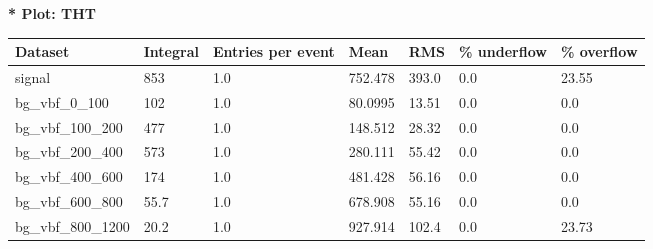 \documentclass[a4paper, 10pt]{article}
\begin{document}
\textbf{* Plot: THT}\\
   \begin{table}[H]
  \begin{center}
    \begin{tabular}{|m{23.0mm}|m{23.0mm}|m{18.0mm}|m{19.0mm}|m{19.0mm}|m{19.0mm}|m{19.0mm}|}
      \hline
      {\cellcolor{yellow}         Dataset}& {\cellcolor{yellow}         Integral}& {\cellcolor{yellow}         Entries per event}& {\cellcolor{yellow}         Mean}& {\cellcolor{yellow}         RMS}& {\cellcolor{yellow}         \% underflow}& {\cellcolor{yellow}         \% overflow}\\
      \hline
      {\cellcolor{white}         signal}& {\cellcolor{white}         853}& {\cellcolor{white}         1.0}& {\cellcolor{white}         752.478}& {\cellcolor{white}         393.0}& {\cellcolor{red}         0.0}& {\cellcolor{red}         23.55}\\
      \hline
      {\cellcolor{white}         bg\_vbf\_0\_100}& {\cellcolor{white}         102}& {\cellcolor{white}         1.0}& {\cellcolor{white}         80.0995}& {\cellcolor{white}         13.51}& {\cellcolor{green}         0.0}& {\cellcolor{green}         0.0}\\
      \hline
      {\cellcolor{white}         bg\_vbf\_100\_200}& {\cellcolor{white}         477}& {\cellcolor{white}         1.0}& {\cellcolor{white}         148.512}& {\cellcolor{white}         28.32}& {\cellcolor{green}         0.0}& {\cellcolor{green}         0.0}\\
      \hline
      {\cellcolor{white}         bg\_vbf\_200\_400}& {\cellcolor{white}         573}& {\cellcolor{white}         1.0}& {\cellcolor{white}         280.111}& {\cellcolor{white}         55.42}& {\cellcolor{green}         0.0}& {\cellcolor{green}         0.0}\\
      \hline
      {\cellcolor{white}         bg\_vbf\_400\_600}& {\cellcolor{white}         174}& {\cellcolor{white}         1.0}& {\cellcolor{white}         481.428}& {\cellcolor{white}         56.16}& {\cellcolor{green}         0.0}& {\cellcolor{green}         0.0}\\
      \hline
      {\cellcolor{white}         bg\_vbf\_600\_800}& {\cellcolor{white}         55.7}& {\cellcolor{white}         1.0}& {\cellcolor{white}         678.908}& {\cellcolor{white}         55.16}& {\cellcolor{green}         0.0}& {\cellcolor{green}         0.0}\\
      \hline
      {\cellcolor{white}         bg\_vbf\_800\_1200}& {\cellcolor{white}         20.2}& {\cellcolor{white}         1.0}& {\cellcolor{white}         927.914}& {\cellcolor{white}         102.4}& {\cellcolor{red}         0.0}& {\cellcolor{red}         23.73}\\

\end{tabular}
\end{center}
\end{table}
\end{document}
